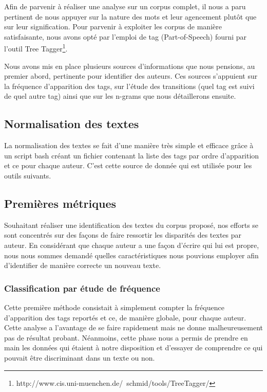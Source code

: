 \documentclass[a4paper]{article}
\begin{document}
Afin de parvenir à réaliser une analyse sur un corpus complet, il nous a paru pertinent de nous appuyer sur la nature des mots et leur agencement plutôt que sur leur signification. Pour parvenir à exploiter les corpus de manière satisfaisante, nous avons opté par l'emploi de tag (Part-of-Speech) fourni par l'outil Tree Tagger\footnote{http://www.cis.uni-muenchen.de/~schmid/tools/TreeTagger/}.

Nous avons mis en place plusieurs sources d'informations que nous pensions, au premier abord, pertinente pour identifier des auteurs. Ces sources s’appuient sur la fréquence d'apparition des tags, sur l'étude des transitions (quel tag est suivi de quel autre tag) ainsi que sur les n-grams que nous détaillerons ensuite.



\subsection{Normalisation des textes}

La normalisation des textes se fait d'une manière très simple et efficace grâce à un script bash créant un fichier contenant la liste des tags par ordre d'apparition et ce pour chaque auteur. C'est cette source de donnée qui est utilisée pour les outils suivants. 

\subsection{Premières métriques}

Souhaitant réaliser une identification des textes du corpus proposé, nos efforts se sont concentrés sur des façons de faire ressortir les disparités des textes par auteur. En considérant que chaque auteur a une façon d'écrire qui lui est propre, nous nous sommes demandé quelles caractéristiques nous pouvions employer afin d'identifier de manière correcte un nouveau texte.

\subsubsection{Classification par étude de fréquence}

Cette première méthode consistait à simplement compter la fréquence d'apparition des tags reportés et ce, de manière globale, pour chaque auteur. Cette analyse a l'avantage de se faire rapidement mais ne donne malheureusement pas de résultat probant. Néanmoins, cette phase nous a permis de prendre en main les données qui étaient à notre disposition et d'essayer de comprendre ce qui pouvait être discriminant dans un texte ou non.
\end{document}
